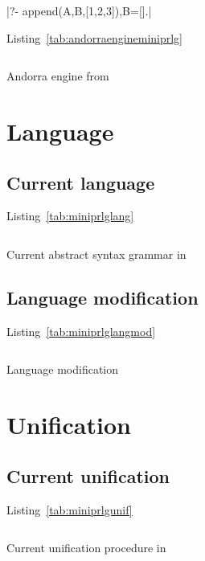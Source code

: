 \documentclass[thesis-solanki.tex]{files}
\begin{document}
|?- append(A,B,[1,2,3]),B=[].|

Listing~\ref{tab:andorraengineminiprlg}

\begin{code-list}[H]
\begin{singlespace}
\inputminted[linenos, firstline=29, lastline=64]{haskell}{haskell-proto3-diatomic-unbank.hs}
\end{singlespace}
\caption{Andorra engine from \cite{website:mini-prolog-hugs98}}
\label{tab:andorraengineminiprlg}
\end{code-list}


\section{Language}
\subsection{Current language}
Listing~\ref{tab:miniprlglang}
\begin{code-list}[H]
\begin{singlespace}
  \inputminted[linenos, firstline=24, lastline=37]{haskell}{haskell-proto3-butter-chicken.hs}
\end{singlespace}
\caption{Current abstract syntax grammar in \cite{website:mini-prolog-hugs98}}
\label{tab:miniprlglang}
\end{code-list}

\subsection{Language modification}
Listing~\ref{tab:miniprlglangmod}

\begin{code-list}[H]
\begin{singlespace}
  \inputminted[linenos, firstline=64, lastline=87]{haskell}{haskell-proto3-uplift-apart.hs}
\end{singlespace}
\caption{Language modification}
\label{tab:miniprlglangmod}
\end{code-list}

\section{Unification}

\subsection{Current unification}
Listing~\ref{tab:miniprlgunif}
\begin{code-list}[H]
\begin{singlespace}
  \inputminted[linenos, firstline=65, lastline=82]{haskell}{haskell-proto3-pentyl-skater.hs}
\end{singlespace}
\caption{Current unification procedure in \cite{website:mini-prolog-hugs98}}
\label{tab:miniprlgunif}
\end{code-list}
\end{document}
